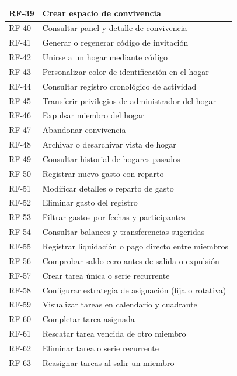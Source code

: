 \begin{longtable}{|p{2cm}|p{12cm}|}
    RF-39 & Crear espacio de convivencia \\ \hline
    RF-40 & Consultar panel y detalle de convivencia \\ \hline
    RF-41 & Generar o regenerar código de invitación \\ \hline
    RF-42 & Unirse a un hogar mediante código \\ \hline
    RF-43 & Personalizar color de identificación en el hogar \\ \hline
    RF-44 & Consultar registro cronológico de actividad \\ \hline
    RF-45 & Transferir privilegios de administrador del hogar \\ \hline
    RF-46 & Expulsar miembro del hogar \\ \hline
    RF-47 & Abandonar convivencia \\ \hline
    RF-48 & Archivar o desarchivar vista de hogar \\ \hline
    RF-49 & Consultar historial de hogares pasados \\ \hline

    RF-50 & Registrar nuevo gasto con reparto \\ \hline
    RF-51 & Modificar detalles o reparto de gasto \\ \hline
    RF-52 & Eliminar gasto del registro \\ \hline
    RF-53 & Filtrar gastos por fechas y participantes \\ \hline
    RF-54 & Consultar balances y transferencias sugeridas \\ \hline
    RF-55 & Registrar liquidación o pago directo entre miembros \\ \hline
    RF-56 & Comprobar saldo cero antes de salida o expulsión \\ \hline

    RF-57 & Crear tarea única o serie recurrente \\ \hline
    RF-58 & Configurar estrategia de asignación (fija o rotativa) \\ \hline
    RF-59 & Visualizar tareas en calendario y cuadrante \\ \hline
    RF-60 & Completar tarea asignada \\ \hline
    RF-61 & Rescatar tarea vencida de otro miembro \\ \hline
    RF-62 & Eliminar tarea o serie recurrente \\ \hline
    RF-63 & Reasignar tareas al salir un miembro \\ \hline


\end{longtable}
